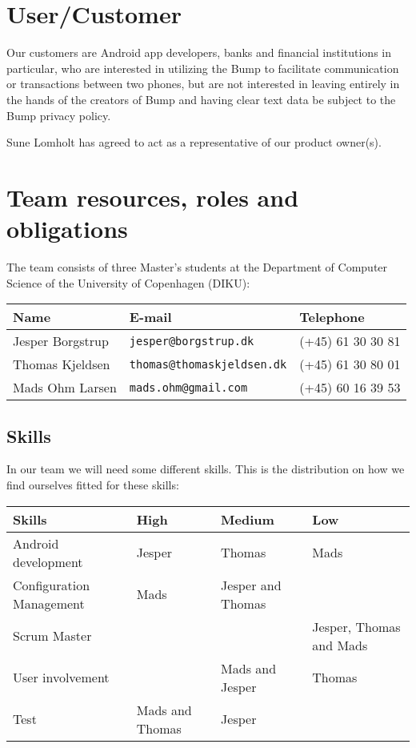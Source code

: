 \documentclass[a4paper,11pt]{article}
\begin{document}

\section{User/Customer} %
\label{sec:user_customer}

Our customers are Android app developers, banks and financial institutions in particular, who are interested in utilizing the Bump to facilitate communication or transactions between two phones, but are not interested in leaving entirely in the hands of the creators of Bump and having clear text data be subject to the Bump privacy policy.

Sune Lomholt has agreed to act as a representative of our product owner(s).


\section{Team resources, roles and obligations} %
\label{sec:team_resources_roles_and_obligations}
The team consists of three Master's students at the Department of Computer Science of the University of Copenhagen (DIKU): \\

\begin{tabular}{|p{4.5cm}|p{5cm}|p{3.5cm}|}
\hline
\textbf{Name}    & E-mail				          &	Telephone         \\\hline
Jesper Borgstrup & {\tt jesper@borgstrup.dk} 	  & (+45) 61 30 30 81 \\\hline
Thomas Kjeldsen  & {\tt thomas@thomaskjeldsen.dk} & (+45) 61 30 80 01 \\\hline
Mads Ohm Larsen  & {\tt mads.ohm@gmail.com} 	  & (+45) 60 16 39 53 \\\hline
\end{tabular}

\subsection{Skills} %
\label{subsec:skills}
In our team we will need some different skills.
This is the distribution on how we find ourselves fitted for these skills: \\

\begin{tabular}{|p{4.5cm}|p{3cm}|p{3cm}|p{3cm}|}
\hline
\textbf{Skills}          & \textbf{High}   & \textbf{Medium} & \textbf{Low} 					 \\\hline
Android development      & Jesper & Thomas & Mads 					 \\\hline
Configuration Management & Mads & Jesper and Thomas          &      					 \\\hline
Scrum Master             &        &        & Jesper, Thomas and Mads \\\hline 
User involvement         &        & Mads and Jesper & Thomas \\\hline
Test                     & Mads and Thomas   & Jesper & \\\hline
\end{tabular}
\end{document}
